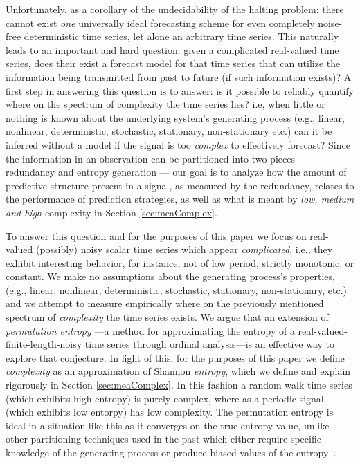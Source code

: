 Unfortunately, as a corollary of the undecidability of the halting problem: there cannot exist \emph{one} universally ideal forecasting scheme for even completely noise-free deterministic time series\cite{weigend-book}, let alone an arbitrary time series. This naturally leads to an important and hard question: given a complicated real-valued time series, does their exist a forecast model for that time series that can utilize the information being transmitted from past to future (if such information exists)? A first step in answering this question is to answer: is it possible to reliably quantify where on the spectrum of complexity the time series lies? i.e, when little or nothing is known about the underlying system's generating process (e.g., linear, nonlinear, deterministic, stochastic, stationary, non-stationary etc.) can it be inferred without a model if the signal is too \emph{complex} to effectively forecast? Since the information in an observation can be partitioned into two pieces --- redundancy and entropy generation\cite{crutchfield2003} --- our goal is to analyze how the amount of predictive structure present in a signal, as measured by the redundancy, relates to the performance of prediction strategies, as well as what is meant by \emph{low, medium and high} complexity in Section \ref{sec:meaComplex}.


To answer this question and for the purposes of this paper we focus on real-valued (possibly) noisy scalar time series which appear \emph{complicated}, i.e., they exhibit interesting behavior, for instance, not of low period, strictly monotonic, or constant. We make no assumptions about the generating process's properties,(e.g., linear, nonlinear, deterministic, stochastic, stationary, non-stationary, etc.) and we attempt to measure empirically where on the previously mentioned spectrum of \emph{complexity} the time series exists.
We argue that an extension of \emph{permutation entropy}
\cite{bandt2002per}---a method for approximating the entropy of a real-valued-finite-length-noisy time series through ordinal analysis---is an effective way to explore that conjecture. In light of this, for the purposes of this paper we define \emph{complexity} as an approximation of Shannon \emph{entropy}, which we define and explain rigorously in Section \ref{sec:meaComplex}. In this fashion a random walk time series (which exhibits high entropy) is purely complex, where as a periodic signal (which exhibits low entorpy) has low complexity. The permutation entropy is ideal in a situation like this as it converges on the true entropy value, unlike other partitioning techniques used in the past which either require specific knowledge of the generating process or produce biased values of the entropy~\cite{bollt2001}.



